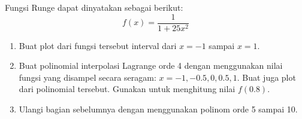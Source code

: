 \begin{soal}
Fungsi Runge dapat dinyatakan sebagai berikut:
\begin{equation*}
f(x) = \frac{1}{1 + 25x^2}
\end{equation*}
\begin{enumerate}[label=(\alph*)]
\item Buat plot dari fungsi tersebut interval dari $x=-1$ sampai $x=1$.
\item Buat polinomial interpolasi Lagrange orde 4 dengan menggunakan nilai
fungsi yang disampel secara seragam: $x = -1, -0.5, 0, 0.5, 1$. Buat juga
plot dari polinomial tersebut. Gunakan untuk menghitung nilai $f(0.8)$.
\item Ulangi bagian sebelumnya dengan menggunakan polinom orde 5 sampai 10.
\end{enumerate}
\end{soal}